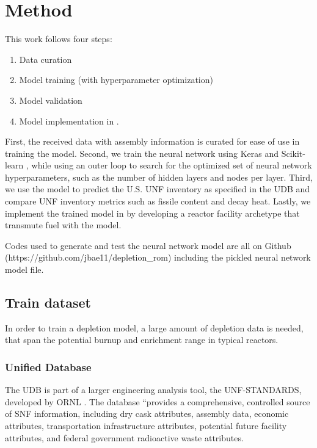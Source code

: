 \section{Method}

This work follows four steps:
\begin{enumerate}
\item Data curation
\item Model training (with hyperparameter optimization)
\item Model validation
\item Model implementation in \Cyclus.
\end{enumerate}
First, the
received data with assembly information is
curated for ease of use in training the model.
Second, we train the neural network using Keras \cite{collet_keras_2015}
and Scikit-learn \cite{pedregosa_scikit-learn_2011},
while using an outer loop to
search for the optimized set of neural network hyperparameters,
such as the number of hidden layers and nodes per layer.
Third, we use the model to predict the U.S. \gls{UNF}
inventory as specified in the \gls{UDB} and compare
\gls{UNF} inventory metrics such as fissile content
and decay heat. Lastly, we implement the trained
model in \Cyclus by developing a reactor facility archetype
that transmute fuel with the model.

Codes used to generate and test the neural network
model are all on Github (https://github.com/jbae11/depletion\_rom)
including the pickled neural network model file.

\subsection{Train dataset}

In order to train a depletion model, a large amount of
depletion data is needed, that span the potential
burnup and enrichment range in typical reactors.

\subsubsection{Unified Database}
The \gls{UDB} is part of a larger engineering
analysis tool, the \gls{UNF-STANDARDS}, developed
by \gls{ORNL} \cite{peterson_used_2013}. The
database ``provides a comprehensive, controlled
source of \gls{SNF} information, including
dry cask attributes, assembly data, economic attributes,
transportation infrastructure attributes, potential future
facility attributes, and federal government radioactive
waste attributes.

